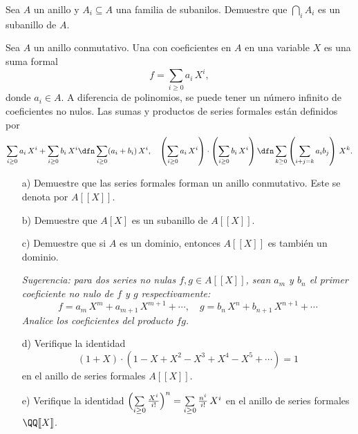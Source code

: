 \begin{ejercicio}
  Sea $A$ un anillo y $A_i \subseteq A$ una familia de subanilos. Demuestre que
  $\bigcap_i A_i$ es un subanillo de $A$.
\end{ejercicio}

\begin{ejercicio}
  \label{ejerc:series-formales}
  Sea $A$ un anillo conmutativo. Una  con
  coeficientes en $A$ en una variable $X$ es una suma formal
  $$f = \sum_{i\ge 0} a_i\,X^i,$$
  donde $a_i \in A$. A diferencia de polinomios, se puede tener un número
  infinito de coeficientes no nulos. Las sumas y productos de series formales
  están definidos por
  $$\sum_{i\ge 0} a_i\,X^i + \sum_{i\ge 0} b_i\,X^i \dfn \sum_{i\ge 0} (a_i + b_i)\,X^i, \quad \left(\sum_{i\ge 0} a_i\,X^i\right) \cdot \left(\sum_{i\ge 0} b_i\,X^i\right) \dfn \sum_{k\ge 0} \left(\sum_{i+j = k} a_i b_j\right)\,X^k.$$

  \begin{enumerate}
  \item[a)] Demuestre que las series formales forman un anillo conmutativo. Este
    se denota por $A [\![X]\!]$.

  \item[b)] Demuestre que $A [X]$ es un subanillo de $A [\![X]\!]$.

  \item[c)] Demuestre que si $A$ es un dominio, entonces $A [\![X]\!]$ es
    también un dominio.

    \emph{Sugerencia: para dos series no nulas $f, g \in A [\![X]\!]$, sean
      $a_m$ y $b_n$ el primer coeficiente no nulo de $f$ y $g$ respectivamente:
      $$f = a_m\,X^m + a_{m+1}\,X^{m+1} + \cdots, \quad g = b_n\,X^n + b_{n+1}\,X^{n+1} + \cdots$$
      Analice los coeficientes del producto $fg$.}

  \item[d)] Verifique la identidad
    $$(1+X)\cdot (1 - X + X^2 - X^3 + X^4 - X^5 + \cdots) = 1$$
    en el anillo de series formales $A [\![X]\!]$.

  \item[e)] Verifique la identidad
    $\Bigl(\sum\limits_{i\ge 0} \frac{X^i}{i!}\Bigr)^n =
    \sum\limits_{i\ge 0} \frac{n^i}{i!}\,X^i$
    en el anillo de series formales $\QQ [\![X]\!]$.
  \end{enumerate}
\end{ejercicio}


